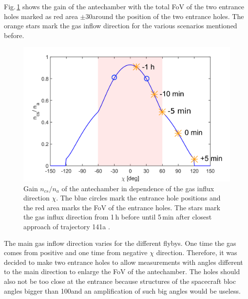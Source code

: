 		Fig.\,\ref{fig:densEnhChiFlyby} shows the gain of the antechamber with the total FoV of the two entrance holes marked as red area $\pm$30\degree around the position of the two entrance holes. The orange stars mark the gas inflow direction for the various scenarios mentioned before.
		\begin{figure}[h!]
			\centering
			\includegraphics[width=.8\textwidth]{Bilder/Chi_theta0_flyby.png}
			\caption{Gain $n_{cs}/n_a$ of the antechamber in dependence of the gas influx direction $\chi$. The blue circles mark the entrance hole positions and the red area marks the FoV of the entrance holes. The stars mark the gas influx direction from 1\,h before until 5\,min after closest approach of trajectory 141a \cite{SOC_Crema3p2}.}
			\label{fig:densEnhChiFlyby}
		\end{figure}
		The main gas inflow direction varies for the different flybys. One time the gas comes from positive and one time from negative $\chi$ direction. Therefore, it was decided to make two entrance holes to allow measurements with angles different to the main direction to enlarge the FoV of the antechamber. The holes should also not be too close at the entrance because structures of the spacecraft bloc angles bigger than 100\degree and an amplification of such big angles would be useless.
		
		
